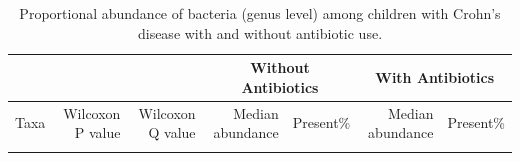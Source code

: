 \newpage
{\footnotesize
	\renewcommand{\arraystretch}{0.7} \setlength{\tabcolsep}{3pt}
	\begin{longtable}{ | l | r | r | r | r | r | r  | }
		\caption[Proportional abundance of bacteria (genus level) among children with Crohn's disease  with and without antibiotic use]{Proportional abundance of bacteria (genus level) among children with Crohn's disease with and without antibiotic use.} 
		\label{TS7} \\
		
		\hline
		\multicolumn{3}{|c|}{} & \multicolumn{2}{c}{Without Antibiotics}
		& \multicolumn{2}{|c|}{With Antibiotics}\\
		\hline 
		Taxa & Wilcoxon P value & Wilcoxon Q value & Median abundance & Present\% & Median abundance & Present\% \\ 
		\hline 
		\endfirsthead
		
		
		\endfoot
		
		\hline 
		\endlastfoot
		
		
		

\end{longtable}}
